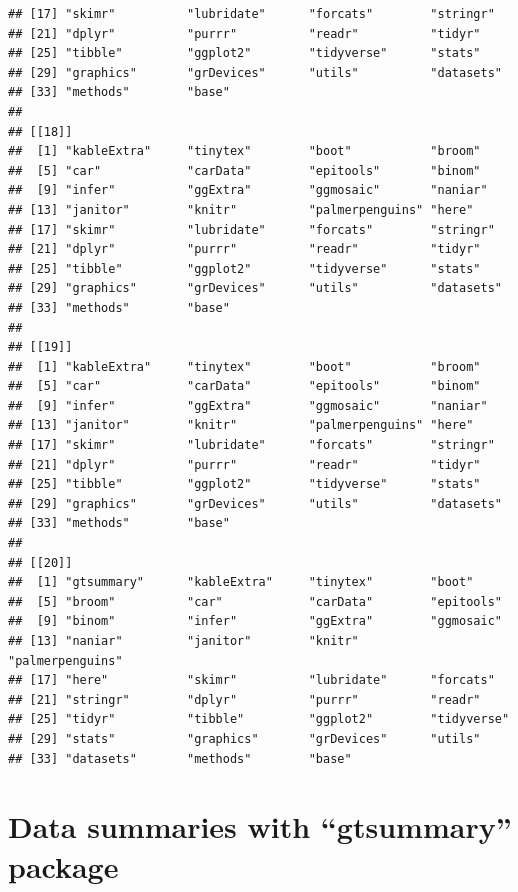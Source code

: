 \documentclass[
]{book}
\begin{document}
\begin{verbatim}
## [17] "skimr"          "lubridate"      "forcats"        "stringr"       
## [21] "dplyr"          "purrr"          "readr"          "tidyr"         
## [25] "tibble"         "ggplot2"        "tidyverse"      "stats"         
## [29] "graphics"       "grDevices"      "utils"          "datasets"      
## [33] "methods"        "base"          
## 
## [[18]]
##  [1] "kableExtra"     "tinytex"        "boot"           "broom"         
##  [5] "car"            "carData"        "epitools"       "binom"         
##  [9] "infer"          "ggExtra"        "ggmosaic"       "naniar"        
## [13] "janitor"        "knitr"          "palmerpenguins" "here"          
## [17] "skimr"          "lubridate"      "forcats"        "stringr"       
## [21] "dplyr"          "purrr"          "readr"          "tidyr"         
## [25] "tibble"         "ggplot2"        "tidyverse"      "stats"         
## [29] "graphics"       "grDevices"      "utils"          "datasets"      
## [33] "methods"        "base"          
## 
## [[19]]
##  [1] "kableExtra"     "tinytex"        "boot"           "broom"         
##  [5] "car"            "carData"        "epitools"       "binom"         
##  [9] "infer"          "ggExtra"        "ggmosaic"       "naniar"        
## [13] "janitor"        "knitr"          "palmerpenguins" "here"          
## [17] "skimr"          "lubridate"      "forcats"        "stringr"       
## [21] "dplyr"          "purrr"          "readr"          "tidyr"         
## [25] "tibble"         "ggplot2"        "tidyverse"      "stats"         
## [29] "graphics"       "grDevices"      "utils"          "datasets"      
## [33] "methods"        "base"          
## 
## [[20]]
##  [1] "gtsummary"      "kableExtra"     "tinytex"        "boot"          
##  [5] "broom"          "car"            "carData"        "epitools"      
##  [9] "binom"          "infer"          "ggExtra"        "ggmosaic"      
## [13] "naniar"         "janitor"        "knitr"          "palmerpenguins"
## [17] "here"           "skimr"          "lubridate"      "forcats"       
## [21] "stringr"        "dplyr"          "purrr"          "readr"         
## [25] "tidyr"          "tibble"         "ggplot2"        "tidyverse"     
## [29] "stats"          "graphics"       "grDevices"      "utils"         
## [33] "datasets"       "methods"        "base"
\end{verbatim}

\chapter*{Data summaries with ``gtsummary'' package}\label{data-summaries-with-gtsummary-package}
\end{document}
